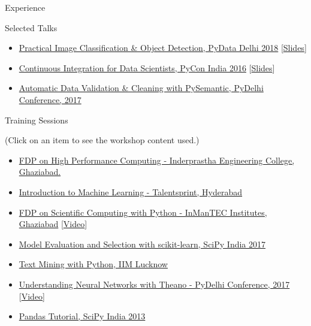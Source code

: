 \documentclass{resume} %
\begin{document}
\begin{rSection}{Experience}
\begin{rSection}{Selected Talks}
    \begin{itemize}
        \item \href{https://youtu.be/mCQYXHJKZW8?t=5351}
            {Practical Image Classification \& Object Detection, PyData Delhi 2018}
            [\href{https://speakerdeck.com/jaidevd/practical-image-classification-and-object-detection}{Slides}]
        \item \href{https://www.youtube.com/watch?v=i5Rw1ITA-Ic}
            {Continuous Integration for Data Scientists, PyCon India 2016}
            [\href{https://github.com/jaidevd/jaidevd.github.io/blob/source/blog/posts/continuous-integration-for-data-scientists.ipynb}{Slides}]
        \item \href{https://www.youtube.com/watch?v=iPz0Cd84Zro}
            {Automatic Data Validation \& Cleaning with PySemantic, PyDelhi Conference, 2017}
    \end{itemize}
\end{rSection}

\end{rSection}
\begin{rSection}{Training Sessions}
    \item (Click on an item to see the workshop content used.)
    \begin{itemize}
        \item
            \href{https://github.com/jaidevd/ipec-fdp}
            {FDP on High Performance Computing -
             Inderprastha Engineering College, Ghaziabad.}
        \item
            \href{https://github.com/jaidevd/talentsprint-workshop}
            {Introduction to Machine Learning - Talentsprint, Hyderabad}
        \item \href{https://github.com/jaidevd/inmantec_fdp}{FDP on Scientific
            Computing with Python - InManTEC Institutes, Ghaziabad}
            [\href{https://sites.google.com/a/inmantec.edu/fdp/videos-and-images}{Video}]
        \item \href{https://github.com/jaidevd/scipy-2017-workshop}
            {Model Evaluation and Selection with scikit-learn, SciPy India 2017}
        \item \href{https://github.com/jaidevd/iiml_textmining}
            {Text Mining with Python, IIM Lucknow}
        \item \href{https://github.com/jaidevd/theano_nn_tutorial}
            {Understanding Neural Networks with Theano - PyDelhi Conference, 2017}
            [\href{https://www.youtube.com/watch?v=H1JNDSpZ3FY}{Video}]
        \item \href{https://github.com/jaidevd/scipy_pandas_tutorial}
            {Pandas Tutorial, SciPy India 2013}
    \end{itemize}
\end{rSection}
\end{document}
